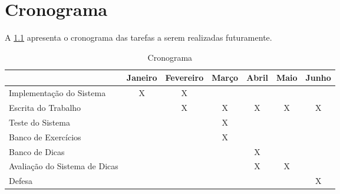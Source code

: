 \chapter{Cronograma}

A \cref{tabela:cronograma} apresenta o cronograma das tarefas a serem realizadas futuramente.

\begin{table}[ht]
	\captionsetup{justification=centering}
	\caption{Cronograma}
	\label{tabela:cronograma}
	\begin{tabular}{|l|c|c|c|c|c|c|}
		\hline
		& Janeiro & Fevereiro & Março & Abril & Maio & Junho \\ \hline
		Implementação do Sistema 		& X       & X         &       &       &      &       \\ \hline
		Escrita do Trabalho      		&         & X         & X     & X     & X    & X     \\ \hline
		Teste do Sistema         		&         &           & X     &       &      &       \\ \hline
		Banco de Exercícios      		&         &           & X     &       &      &       \\ \hline
		Banco de Dicas           		&         &           &       & X     &      &       \\ \hline
		Avaliação do Sistema de Dicas   &         &           &       & X     & X    &       \\ \hline
		Defesa                     		&         &           &       &       &      & X     \\ \hline
	\end{tabular}
\end{table}